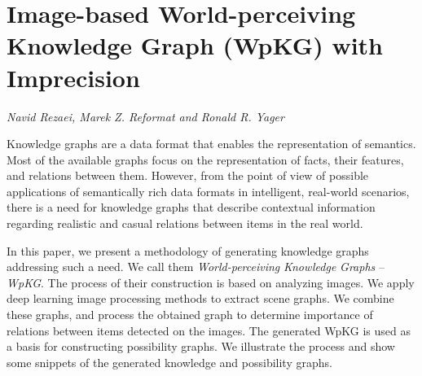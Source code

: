 \documentclass[../booklet.tex]{subfiles}
\begin{document}
\section[Image-based World-perceiving Knowledge Graph (WpKG) with Imprecision. {\it Navid Rezaei, Marek Z. Reformat and Ronald R. Yager}]{Image-based World-perceiving Knowledge Graph (WpKG) with Imprecision}
  

\begin{center}
  {\it Navid Rezaei, Marek Z. Reformat and Ronald R. Yager}
\end{center}

\vskip 0.8cm



Knowledge graphs are a data format that enables the representation of semantics. Most of the available graphs focus on the representation of facts, their features, and relations between them. However, from the point of view of possible applications of semantically rich data formats in intelligent, real-world scenarios, there is a need for knowledge graphs that describe contextual information regarding realistic and casual relations between items in the real world.

In this paper, we present a methodology of generating knowledge graphs addressing such a need. We call them {\em World-perceiving} {\em Knowledge} {\em Gra\-phs} -- {\em WpKG}. The process of their construction is based on analyzing images. We apply deep learning image processing methods to extract scene graphs. We  combine these graphs, and process the obtained graph to determine  importance of relations between items detected on the images. The generated WpKG is used as a basis for constructing possibility graphs. We illustrate the process and show some snippets of the generated knowledge and possibility graphs.


\end{document}
